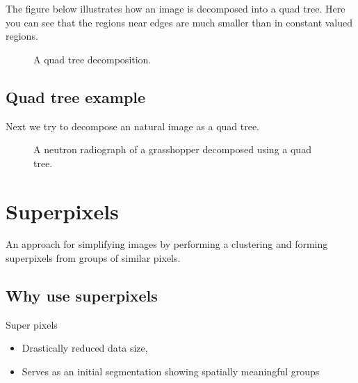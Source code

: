 \documentclass[letterpaper,10pt,english]{sphinxmanual}
\begin{document}
\sphinxAtStartPar
The figure below illustrates how an image is decomposed into a quad tree. Here you can see that the regions near edges are much smaller than in constant valued regions.

\begin{figure}[htbp]
\centering
\capstart

\noindent{}
\caption{A quad tree decomposition.}\label{\detokenize{05-AdvancedSegmentation:id6}}\end{figure}




\section{Quad tree example}
\label{\detokenize{05-AdvancedSegmentation:quad-tree-example}}
\sphinxAtStartPar
Next we try to decompose an natural image as a quad tree.

\begin{figure}[htbp]
\centering
\capstart

\noindent{}
\caption{A neutron radiograph of a grasshopper decomposed using a quad tree.}\label{\detokenize{05-AdvancedSegmentation:id7}}\end{figure}




\chapter{Superpixels}
\label{\detokenize{05-AdvancedSegmentation:superpixels}}
\sphinxAtStartPar
An approach for simplifying images by performing a clustering and forming super\sphinxhyphen{}pixels from groups of similar pixels.



\sphinxAtStartPar
{}


\section{Why use superpixels}
\label{\detokenize{05-AdvancedSegmentation:why-use-superpixels}}
\sphinxAtStartPar
Super pixels
\begin{itemize}
\item {} 
\sphinxAtStartPar
Drastically reduced data size,

\item {} 
\sphinxAtStartPar
Serves as an initial segmentation showing spatially meaningful groups

\end{itemize}
\end{document}
